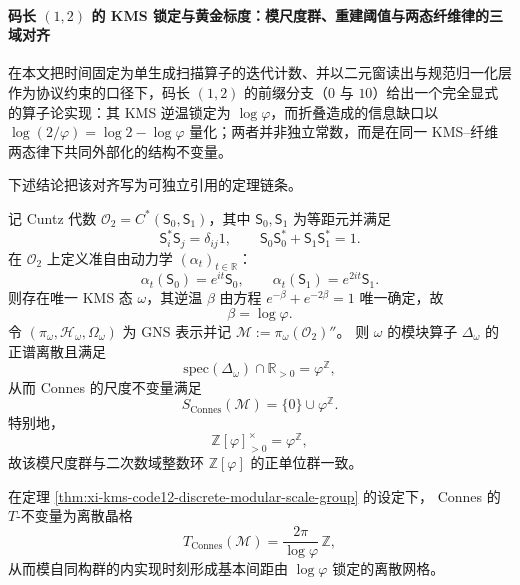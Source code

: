 \paragraph{码长 \texorpdfstring{$(1,2)$}{(1,2)} 的 KMS 锁定与黄金标度：模尺度群、重建阈值与两态纤维律的三域对齐}
在本文把时间固定为单生成扫描算子的迭代计数、并以二元窗读出与规范归一化层作为协议约束的口径下，码长 \((1,2)\) 的前缀分支（\(0\) 与 \(10\)）给出一个完全显式的算子论实现：其 KMS 逆温锁定为 \(\log\varphi\)，而折叠造成的信息缺口以 \(\log(2/\varphi)=\log 2-\log\varphi\) 量化；两者并非独立常数，而是在同一 KMS--纤维两态律下共同外部化的结构不变量。
\par
下述结论把该对齐写为可独立引用的定理链条。
\par

\begin{theorem}\label{thm:xi-kms-code12-discrete-modular-scale-group}
记 Cuntz 代数 \(\mathcal{O}_2=C^\ast(\mathsf{S}_0,\mathsf{S}_1)\)，其中 \(\mathsf{S}_0,\mathsf{S}_1\) 为等距元并满足
\[
\mathsf{S}_i^\ast\mathsf{S}_j=\delta_{ij}1,
\qquad
\mathsf{S}_0\mathsf{S}_0^\ast+\mathsf{S}_1\mathsf{S}_1^\ast=1.
\]
在 \(\mathcal{O}_2\) 上定义准自由动力学 \((\alpha_t)_{t\in\mathbb R}\)：
\[
\alpha_t(\mathsf{S}_0)=e^{it}\mathsf{S}_0,
\qquad
\alpha_t(\mathsf{S}_1)=e^{2it}\mathsf{S}_1.
\]
则存在唯一 KMS 态 \(\omega\)，其逆温 \(\beta\) 由方程 \(e^{-\beta}+e^{-2\beta}=1\) 唯一确定，故
\[
\beta=\log\varphi.
\]
令 \((\pi_\omega,\mathcal H_\omega,\Omega_\omega)\) 为 GNS 表示并记 \(\mathcal M:=\pi_\omega(\mathcal{O}_2)''\)。
则 \(\omega\) 的模块算子 \(\Delta_\omega\) 的正谱离散且满足
\[
\mathrm{spec}(\Delta_\omega)\cap\mathbb R_{>0}=\varphi^{\mathbb Z},
\]
从而 Connes 的尺度不变量满足
\[
S_{\mathrm{Connes}}(\mathcal M)=\{0\}\cup\varphi^{\mathbb Z}.
\]
特别地，
\[
\mathbb Z[\varphi]_{>0}^\times=\varphi^{\mathbb Z},
\]
故该模尺度群与二次数域整数环 \(\mathbb Z[\varphi]\) 的正单位群一致。
\end{theorem}

\begin{corollary}\label{cor:xi-kms-code12-connes-T-invariant}
在定理 \ref{thm:xi-kms-code12-discrete-modular-scale-group} 的设定下，
Connes 的 \(T\)-不变量为离散晶格
\[
T_{\mathrm{Connes}}(\mathcal M)=\frac{2\pi}{\log\varphi}\,\mathbb Z,
\]
从而模自同构群的内实现时刻形成基本间距由 \(\log\varphi\) 锁定的离散网格。
\end{corollary}


